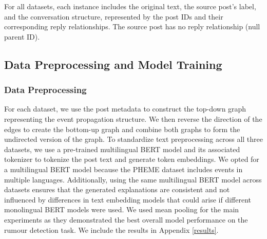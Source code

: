 For all datasets, each instance includes the original text, the source post's label, and the conversation structure, represented by the post IDs and their corresponding reply relationships. The source post has no reply relationship (null parent ID).


\subsection{Data Preprocessing and Model Training}
\subsubsection{Data Preprocessing} 
For each dataset, we use the post metadata to construct the top-down graph representing the event propagation structure. We then reverse the direction of the edges to create the bottom-up graph and combine both graphs to form the undirected version of the graph. To standardize text preprocessing across all three datasets, we use a pre-trained multilingual BERT model \cite{Devlin2019BERTPO} and its associated tokenizer to tokenize the post text and generate token embeddings. We opted for a multilingual BERT model because the PHEME dataset includes events in multiple languages. Additionally, using the same multilingual BERT model across datasets ensures that the generated explanations are consistent and not influenced by differences in text embedding models that could arise if different monolingual BERT models were used. We used mean pooling for the main experiments as they demonstrated the best overall model performance on the rumour detection task. We include the results in Appendix \ref{results}.



